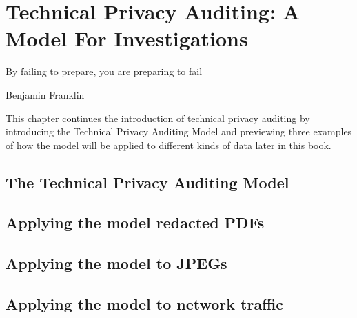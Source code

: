 \chapter{Technical Privacy Auditing: A Model For Investigations}
\setlength{\epigraphwidth}{3in}
\epigraph{By failing to prepare, you are preparing to fail}{Benjamin Franklin}

This chapter continues the introduction of technical privacy
auditing by introducing the Technical Privacy Auditing Model and
previewing three examples of how the model will be applied to
different kinds of data later in this book.

\section{The Technical Privacy Auditing Model}

\section{Applying the model redacted PDFs}

\section{Applying the model to JPEGs}

\section{Applying the model to network traffic}


